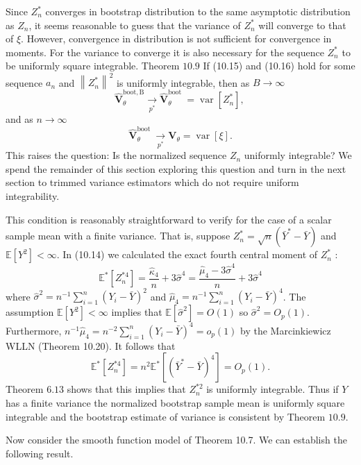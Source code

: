\documentclass[10pt]{article}
\begin{document}
Since $Z_{n}^{*}$ converges in bootstrap distribution to the same asymptotic distribution as $Z_{n}$, it seems reasonable to guess that the variance of $Z_{n}^{*}$ will converge to that of $\xi$. However, convergence in distribution is not sufficient for convergence in moments. For the variance to converge it is also necessary for the sequence $Z_{n}^{*}$ to be uniformly square integrable. Theorem $10.9$ If (10.15) and (10.16) hold for some sequence $a_{n}$ and $\left\|Z_{n}^{*}\right\|^{2}$ is uniformly integrable, then as $B \rightarrow \infty$
$$
\widehat{\boldsymbol{V}}_{\theta}^{\mathrm{boot}, \mathrm{B}} \underset{p^{*}}{\longrightarrow} \widehat{\boldsymbol{V}}_{\theta}^{\text {boot }}=\operatorname{var}\left[Z_{n}^{*}\right] \text {, }
$$
and as $n \rightarrow \infty$
$$
\widehat{\boldsymbol{V}}_{\theta}^{\text {boot }} \underset{p^{*}}{\longrightarrow} \boldsymbol{V}_{\theta}=\operatorname{var}[\xi] .
$$
This raises the question: Is the normalized sequence $Z_{n}$ uniformly integrable? We spend the remainder of this section exploring this question and turn in the next section to trimmed variance estimators which do not require uniform integrability.

This condition is reasonably straightforward to verify for the case of a scalar sample mean with a finite variance. That is, suppose $Z_{n}^{*}=\sqrt{n}\left(\bar{Y}^{*}-\bar{Y}\right)$ and $\mathbb{E}\left[Y^{2}\right]<\infty$. In (10.14) we calculated the exact fourth central moment of $Z_{n}^{*}$ :
$$
\mathbb{E}^{*}\left[Z_{n}^{* 4}\right]=\frac{\widehat{\kappa}_{4}}{n}+3 \widehat{\sigma}^{4}=\frac{\widehat{\mu}_{4}-3 \widehat{\sigma}^{4}}{n}+3 \widehat{\sigma}^{4}
$$
where $\widehat{\sigma}^{2}=n^{-1} \sum_{i=1}^{n}\left(Y_{i}-\bar{Y}\right)^{2}$ and $\widehat{\mu}_{4}=n^{-1} \sum_{i=1}^{n}\left(Y_{i}-\bar{Y}\right)^{4}$. The assumption $\mathbb{E}\left[Y^{2}\right]<\infty$ implies that $\mathbb{E}\left[\widehat{\sigma}^{2}\right]=O(1)$ so $\widehat{\sigma}^{2}=O_{p}(1)$. Furthermore, $n^{-1} \widehat{\mu}_{4}=n^{-2} \sum_{i=1}^{n}\left(Y_{i}-\bar{Y}\right)^{4}=o_{p}(1)$ by the Marcinkiewicz WLLN (Theorem 10.20). It follows that
$$
\mathbb{E}^{*}\left[Z_{n}^{* 4}\right]=n^{2} \mathbb{E}^{*}\left[\left(\bar{Y}^{*}-\bar{Y}\right)^{4}\right]=O_{p}(1) .
$$
Theorem $6.13$ shows that this implies that $Z_{n}^{* 2}$ is uniformly integrable. Thus if $Y$ has a finite variance the normalized bootstrap sample mean is uniformly square integrable and the bootstrap estimate of variance is consistent by Theorem $10.9$.

Now consider the smooth function model of Theorem 10.7. We can establish the following result.
\end{document}
